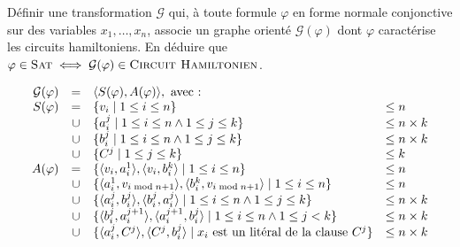 \begin{exercice}[\textsc{Circuit Hamiltonien} est NP-complet%
    \footnote{Vidéo détaillée de la réduction de \textsc{3-SAT} à \textsc{Cycle Hamiltonien} : \url{https://www.youtube.com/watch?v=OHnX-R_SBpM}}]
  \ifcorrection{\newpage}
  \begin{question}
  \item Définir une transformation $\mathcal{G}$ qui, à toute formule $\varphi$
    en forme normale conjonctive sur des variables $x_1,\dots,x_n$, associe un graphe orienté $\mathcal{G}(\varphi)$
    dont $\varphi$ caractérise les circuits hamiltoniens.
    En déduire que $\varphi \in \textsc{Sat} \iff \mathcal{G}(\varphi) \in \textsc{Circuit Hamiltonien}$.
  \end{question}
  \begin{correction}
    $$
    \begin{array}{rcl@{\quad}l}
      \mathcal{G}(\varphi) &=& \langle S(\varphi), A(\varphi) \rangle, \text{ avec :} \\
      S(\varphi) &=&  \{ v_i   \mid 1 \le i \le n  \}                                                                                                     & \le n\\
      &\cup& \{ a_i^j \mid 1 \le i \le n \land 1 \le j \le k\}                                                                                            & \le n \times k\\
      &\cup& \{ b_i^j \mid 1 \le i \le n \land 1 \le j \le k\}                                                                                            & \le n \times k\\
      &\cup& \{ C^j   \mid 1 \le j \le k\}                                                                                                                 & \le k\\ 
      A(\varphi) &=&  \{ \langle v_i, a_i^1 \rangle, \langle v_i, b_i^k  \rangle             \mid 1 \le i \le n  \}                                        & \le n\\
      &\cup& \{ \langle a_i^1, v_{i \bmod n + 1} \rangle, \langle b_i^k, v_{i \bmod n + 1} \rangle \mid 1 \le i \le n  \}                                        & \le n\\
      &\cup& \{ \langle a_i^j, b_i^j \rangle,          \langle b_i^j, a_i^j \rangle          \mid 1 \le i \le n  \land 1 \le j \le k \}                    & \le n \times k\\
      &\cup& \{ \langle b_i^j, a_i^{j+1} \rangle,       \langle a_i^{j+1}, b_i^j \rangle       \mid 1 \le i \le n  \land 1 \le j < k \}                      & \le n \times k\\
      &\cup& \{ \langle a_i^j, C^j \rangle,            \langle C^j, b_i^j \rangle            \mid x_i \text{ est un litéral de la clause } C^j \}          & \le n \times k\\

\end{array}$$
\end{correction}
\end{exercice}
